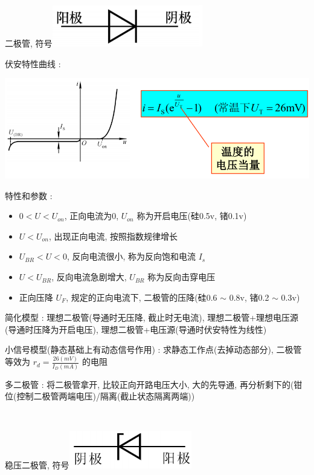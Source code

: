 \documentclass[UTF8, 12pt]{ctexart}
\begin{document}
	\noindent
	二极管, 符号\includegraphics[scale = 0.2]{01/二极管符号}

	伏安特性曲线 :

	\includegraphics[scale = 0.4]{01/二极管伏安特性.png}

	特性和参数 :
	\begin{itemize}[leftmargin = 4em]
		\item $ 0 < U < U_{on} $, 正向电流为0, $ U_{on} $ 称为开启电压(硅0.5v, 锗0.1v)
		\item $ U < U_{on} $, 出现正向电流, 按照指数规律增长
		\item $ U_{BR} < U < 0 $, 反向电流很小, 称为反向饱和电流 $ I_{s} $
		\item $ U < U_{BR} $, 反向电流急剧增大, $ U_{BR} $ 称为反向击穿电压 
		\item 正向压降 $ U_{F} $, 规定的正向电流下, 二极管的压降(硅0.6 $ \sim $ 0.8v, 锗0.2 $ \sim $ 0.3v)
	\end{itemize}

	简化模型 : 理想二极管(导通时无压降, 截止时无电流), 理想二极管+理想电压源(导通时压降为开启电压), 理想二极管+电压源(导通时伏安特性为线性)

	小信号模型(静态基础上有动态信号作用) : 求静态工作点(去掉动态部分), 二极管等效为 $ r_{d} = \frac{26(mV)}{I_{D}(mA)} $ 的电阻

	多二极管 : 将二极管拿开, 比较正向开路电压大小, 大的先导通, 再分析剩下的(钳位(控制二极管两端电压)/隔离(截止状态隔离两端))

	~

	\noindent
	稳压二极管, 符号\includegraphics[scale = 0.2]{01/稳压二极管符号.png}
\end{document}
